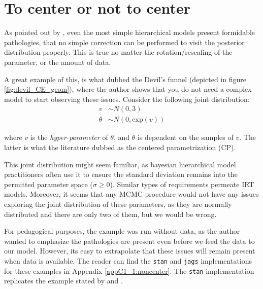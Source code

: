 
\section{To center or not to center} \label{sect:noncenter}

As pointed out by \citet{Betancourt_et_al_2013}, even the most simple hierarchical models present formidable pathologies, that no simple correction can be performed to visit the posterior distribution properly. This is true no matter the rotation/rescaling of the parameter, or the amount of data. 

A great example of this, is what \citet{McElreath_2020} dubbed the Devil's funnel (depicted in figure \ref{fig:devil_CE_geom}), where the author shows that you do not need a complex model to start observing these issues. Consider the following joint distribution:
%
\begin{equation} \label{eq:devil}
	\begin{split}	
		v &\sim N(0, 3) \\
		\theta &\sim N(0, \text{exp}(v))
	\end{split}
\end{equation}

\noindent where $v$ is the \textit{hyper-parameter} of $\theta$, and $\theta$ is dependent on the samples of $v$. The latter is what the literature dubbed as the centered parametrization (CP).

This joint distribution might seem familiar, as bayesian hierarchical model practitioners often use it to ensure the standard deviation remains into the permitted parameter space ($\sigma \geq 0$). Similar types of requirements permeate IRT models. Moreover, it seems that any MCMC procedure would not have any issues exploring the joint distribution of these parameters, as they are normally distributed and there are only two of them, but we would be wrong. 

For pedagogical purposes, the example was run without data, as the author wanted to emphasize the pathologies are present even before we feed the data to our model. However, its easy to extrapolate that these issues will remain present when data is available. The reader can find the \texttt{stan} and \texttt{jags} implementations for these examples in Appendix \ref{appC1_1:noncenter}. The \texttt{stan} implementation replicates the example stated by \citet{Betancourt_et_al_2013} and \citet{McElreath_2020}.

